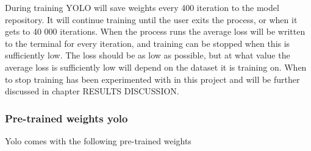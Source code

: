 During training YOLO will save weights every 400 iteration to the model repository. It will continue training until the user exits the process, or when it gets to 40 000 iterations. When the process runs the average loss will be written to the terminal for every iteration, and training can be stopped when this is sufficiently low. The loss should be as low as possible, but at what value the average loss is sufficiently low will depend on the dataset it is training on. When to stop training has been experimented with in this project and will be further discussed in chapter RESULTS DISCUSSION.

\newpage

\subsubsection{Pre-trained weights yolo}
Yolo comes with the following pre-trained weights

